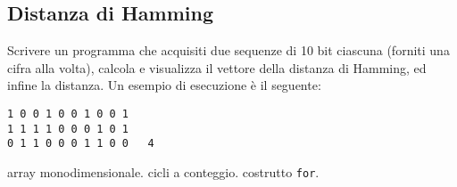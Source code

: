 \subsection{Distanza di Hamming}
Scrivere un programma che acquisiti due sequenze di 10 bit ciascuna (forniti una cifra alla volta), calcola e visualizza il vettore della distanza di Hamming, ed infine la distanza. Un esempio di esecuzione \`e il seguente:
\begin{verbatim}
1 0 0 1 0 0 1 0 0 1
1 1 1 1 0 0 0 1 0 1
0 1 1 0 0 0 1 1 0 0   4
\end{verbatim}

\begin{tags}
array monodimensionale. cicli a conteggio. costrutto \texttt{for}.
\end{tags}


